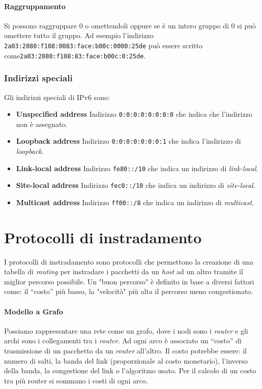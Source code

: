             \paragraph{Raggruppamento} Si possono raggruppare $0$ o omettendoli oppure se è un intero gruppo di $0$ si può omettere tutto il gruppo. Ad esempio l'indirizzo \texttt{2a03:2880:f108:0083:face:b00c:0000:25de} può essere scritto come\texttt{2a03:2880:f108:83:face:b00c:0:25de}. 
        \subsubsection{Indirizzi speciali}
            Gli indirizzi speciali di \Acrshort*{IPv6} sono: \begin{itemize}
                \item \textbf{Unspecified address} Indirizzo \texttt{0:0:0:0:0:0:0:0} che indica che l'indirizzo non è assegnato.
                \item \textbf{Loopback address} Indirizzo \texttt{0:0:0:0:0:0:0:1} che indica l'indirizzo di \textit{loopback}.
                \item \textbf{Link-local address} Indirizzo \texttt{fe80::/10} che indica un indirizzo di \textit{link-local}.
                \item \textbf{Site-local address} Indirizzo \texttt{fec0::/10} che indica un indirizzo di \textit{site-local}.
                \item \textbf{Multicast address} Indirizzo \texttt{ff00::/8} che indica un indirizzo di \textit{multicast}.
            \end{itemize}
\section{Protocolli di instradamento}
    I protocolli di instradamento sono protocolli che permettono la creazione di una tabella di \textit{routing} per instradare i pacchetti da un \textit{host} ad un altro tramite il miglior percorso possibile. Un "buon percorso" è definito in base a diversi fattori come: il ``costo'' più basso, la "velocità" più alta il percorso meno congestionato. 
    \paragraph{Modello a Grafo} Possiamo rappresentare una rete come un grafo, dove i nodi sono i \textit{router} e gli archi sono i collegamenti tra i \textit{router}. Ad ogni arco è associato un ``costo'' di trasmissione di un pacchetto da un \textit{router} all'altro. Il costo potrebbe essere: il numero di salti, la banda del link (proporzionale al costo monetario), l'inverso della banda, la congestione del link o l'algoritmo usato. Per il calcolo di un costo tra più router si sommano i costi di ogni arco.
